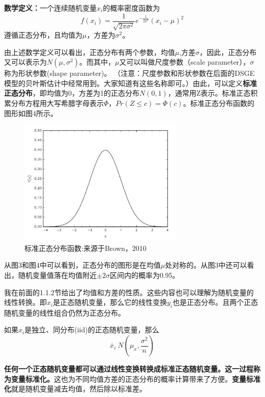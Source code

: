 \documentclass[cn,10pt,math=newtx,citestyle=gb7714-2015,bibstyle=gb7714-2015]{elegantbook}
\begin{document}
	\textbf{数学定义：}一个连续随机变量$x_i$的概率密度函数为
	\begin{equation}
		f(x_i)=\frac{1}{\sqrt{2\pi\sigma^2}}e^{-\frac{1}{2\sigma^2}}(x_i-\mu)^2
	\end{equation}
	遵循正态分布，且均值为$\mu$，方差为$\sigma^2$。
	
	由上述数学定义可以看出，正态分布有两个参数，均值$\mu$,方差$\sigma$，因此，正态分布又可以表示为$N(\mu,\sigma^2)$。而其中，$\mu$又可以叫做尺度参数（scale parameter），$\sigma$称为形状参数(shape parameter)。 （注意：尺度参数和形状参数在后面的DSGE模型的贝叶斯估计中经常用到。大家知道有这些名称即可。）由此，可以定义\textbf{标准正态分布}，即均值为0，方差为1的正态分布$N(0,1)$，通常用Z表示。标准正态积累分布方程用大写希腊字母表示$\Phi$，$Pr(Z\le{c})=\Phi(c)$。标准正态分布函数的图形如图4所示。
		\begin{figure}[htbp]
		\centering
		\includegraphics[width=0.7\textwidth]{snormal.jpg}
		\caption{标准正态分布函数:来源于Brown，2010}\label{fig:digit}
	\end{figure}
	

	
	从图3和图4中可以看到，正态分布的图形是在均值$\mu$处对称的。从图3中还可以看出，随机变量值落在均值附近$\pm2\sigma$区间内的概率为0.95。
	
	我在前面的1.1.2节给出了均值和方差的性质。这些内容也可以理解为随机变量的线性转换。即$x_i$是正态随机变量，那么它的线性变换$y_i$也是正态分布。且两个正态随机变量的线性组合仍然为正态分布。
	
	如果$x_i$是独立、同分布(iid)的正态随机变量，那么
	\begin{equation}
		\overline{x}_i~N(\mu_x,\frac{\sigma^2}{n})
	\end{equation}
	
	\textbf{任何一个正态随机变量都可以通过线性变换转换成标准正态随机变量。这一过程称为变量标准化。}这也为不同均值方差的正态分布的概率计算带来了方便。\textbf{变量标准化}就是随机变量减去均值，然后除以标准差。
	
\end{document}
